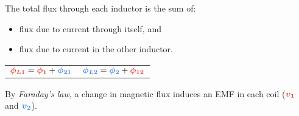 \begin{multicols}{2}
{        The total flux through each inductor is the sum of:
        \begin{itemize}
            \item flux due to current through itself, and
            \item flux due to current in the other inductor.
        \end{itemize}

        \begin{tabularx}{\textwidth}{CC}
            $\memphR{\phi_{L1}} = \memphR{\phi_1} + \memphB{\phi_{21}}$ &
            $\memphB{\phi_{L2}} = \memphB{\phi_2} + \memphR{\phi_{12}}$ \\
        \end{tabularx}

        By \textit{Faraday's law}, a change in magnetic flux induces an EMF in each coil ($\memphR{v_1}$ and $\memphB{v_2}$).


}
\end{multicols}
